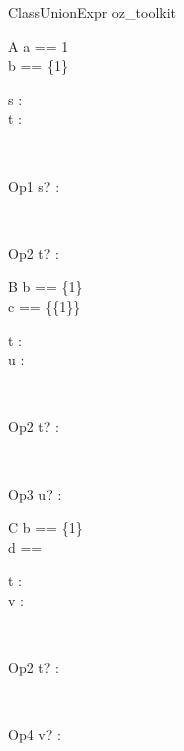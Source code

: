 \begin{zsection}
  \SECTION ClassUnionExpr \parents oz\_toolkit
\end{zsection}

\begin{class}{A}
  a == 1\\
  b == \{1\}\\
  \begin{state}
    s : \nat\\
    t : \power \nat
  \end{state}\\
  \begin{op}{Op1}
    s? : \nat
  \end{op}\\
  \begin{op}{Op2}
    t? : \power \nat
  \end{op}
\end{class}

\begin{class}{B}
  b == \{1\}\\
  c == \{\{1\}\}\\
  \begin{state}
    t : \power \nat\\
    u : \power \power \nat
  \end{state}\\
  \begin{op}{Op2}
    t? : \power \nat
  \end{op}\\
  \begin{op}{Op3}
    u? : \power \power \nat
  \end{op}
\end{class}

\begin{class}{C}
  b == \{1\}\\
  d == \power\nat\\
  \begin{state}
    t : \power \nat\\
    v : \power \power \power \nat
  \end{state}\\
  \begin{op}{Op2}
    t? : \power \nat
  \end{op}\\
  \begin{op}{Op4}
    v? : \power \power \power \nat
  \end{op}\\ 
\end{class}

